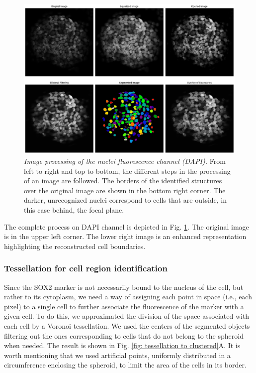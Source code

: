 \documentclass[fleqn,10pt]{wlscirep}
\begin{document}
\begin{figure}[p]
    \centering
    \includegraphics[width=\textwidth]{images/nuclei_processing_horizontal.png}
    \caption{\emph{Image processing of the nuclei fluorescence channel (DAPI).} From left to right and top to bottom, the different steps in the processing of an image are followed. The borders of the identified structures over the original image are shown in the bottom right corner. The darker, unrecognized nuclei correspond to cells that are outside, in this case behind, the focal plane.}
    \label{fig: nuclei processing}
\end{figure}

The complete process on DAPI channel is depicted in Fig. \ref{fig: nuclei processing}. The original image is in the upper left corner. The lower right image is an enhanced representation highlighting the reconstructed cell boundaries.  


\subsubsection*{Tessellation for cell region identification}
Since the SOX2 marker is not necessarily bound to the nucleus of the cell, but rather to its cytoplasm, we need a way of assigning each point in space (i.e., each pixel) to a single cell to further associate the fluorescence of the marker with a given cell. To do this, we approximated the division of the space associated with each cell by a Voronoi tessellation. We used the centers of the segmented objects filtering out the ones corresponding to cells that do not belong to the spheroid when needed. The result is shown in Fig. \ref{fig: tessellation to clustered}A. It is worth mentioning that we used artificial points, uniformly distributed in a circumference enclosing the spheroid, to limit the area of the cells in its border.
\end{document}
